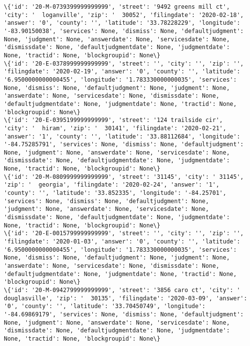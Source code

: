 \documentclass[11pt]{article}
\begin{document}
\begin{Verbatim}[commandchars=\\\{\}]
\{'id': '20-M-0739399999999999', 'street': '9492 greens mill ct', 'city': '  loganville', 'zip': '  30052', 'filingdate': '2020-02-18', 'answer': '0', 'county': '', 'latitude': '33.78228229', 'longitude': '-83.90150038', 'services': None, 'dismiss': None, 'defaultjudgment': None, 'judgment': None, 'answerdate': None, 'servicesdate': None, 'dismissdate': None, 'defaultjudgmentdate': None, 'judgmentdate': None, 'tractid': None, 'blockgroupid': None\}
\{'id': '20-E-0378999999999999', 'street': '', 'city': '', 'zip': '', 'filingdate': '2020-02-19', 'answer': '0', 'county': '', 'latitude': '6.9500000000000455', 'longitude': '1.783330000000035', 'services': None, 'dismiss': None, 'defaultjudgment': None, 'judgment': None, 'answerdate': None, 'servicesdate': None, 'dismissdate': None, 'defaultjudgmentdate': None, 'judgmentdate': None, 'tractid': None, 'blockgroupid': None\}
\{'id': '20-E-0395199999999999', 'street': '124 trailside cir', 'city': '  hiram', 'zip': '  30141', 'filingdate': '2020-02-21', 'answer': '1', 'county': '', 'latitude': '33.88112684', 'longitude': '-84.75285791', 'services': None, 'dismiss': None, 'defaultjudgment': None, 'judgment': None, 'answerdate': None, 'servicesdate': None, 'dismissdate': None, 'defaultjudgmentdate': None, 'judgmentdate': None, 'tractid': None, 'blockgroupid': None\}
\{'id': '20-M-0809999999999999', 'street': '31145', 'city': ' 31145', 'zip': '  georgia', 'filingdate': '2020-02-24', 'answer': '1', 'county': '', 'latitude': '33.852335', 'longitude': '-84.25701', 'services': None, 'dismiss': None, 'defaultjudgment': None, 'judgment': None, 'answerdate': None, 'servicesdate': None, 'dismissdate': None, 'defaultjudgmentdate': None, 'judgmentdate': None, 'tractid': None, 'blockgroupid': None\}
\{'id': '20-E-0015799999999999', 'street': '', 'city': '', 'zip': '', 'filingdate': '2020-01-03', 'answer': '0', 'county': '', 'latitude': '6.9500000000000455', 'longitude': '1.783330000000035', 'services': None, 'dismiss': None, 'defaultjudgment': None, 'judgment': None, 'answerdate': None, 'servicesdate': None, 'dismissdate': None, 'defaultjudgmentdate': None, 'judgmentdate': None, 'tractid': None, 'blockgroupid': None\}
\{'id': '20-M-0942799999999999', 'street': '3856 caro ct', 'city': '  douglasville', 'zip': '  30135', 'filingdate': '2020-03-09', 'answer': '0', 'county': '', 'latitude': '33.70450749', 'longitude': '-84.69869179', 'services': None, 'dismiss': None, 'defaultjudgment': None, 'judgment': None, 'answerdate': None, 'servicesdate': None, 'dismissdate': None, 'defaultjudgmentdate': None, 'judgmentdate': None, 'tractid': None, 'blockgroupid': None\}

\end{Verbatim}
\end{document}
